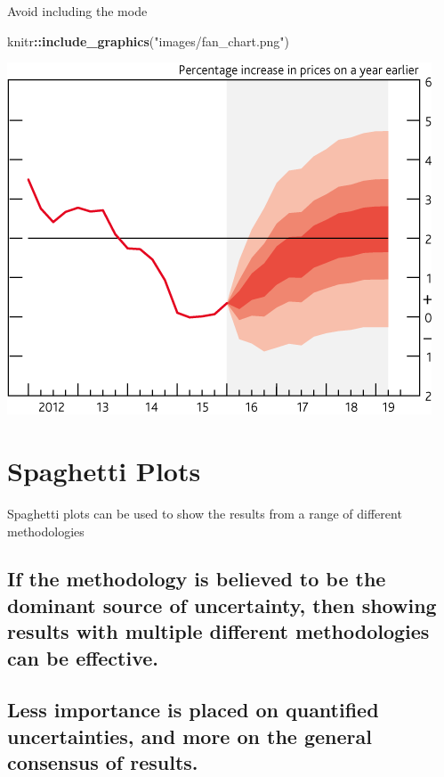 \documentclass[]{book}
\newenvironment{Shaded}{\begin{snugshade}}{\end{snugshade}}
\newcommand{\KeywordTok}[1]{\textcolor[rgb]{0.13,0.29,0.53}{\textbf{#1}}}
\newcommand{\StringTok}[1]{\textcolor[rgb]{0.31,0.60,0.02}{#1}}
\newcommand{\OperatorTok}[1]{\textcolor[rgb]{0.81,0.36,0.00}{\textbf{#1}}}
\newcommand{\NormalTok}[1]{#1}
\begin{document}
 Avoid including the mode

\begin{Shaded}
\begin{Highlighting}[]
\NormalTok{knitr}\OperatorTok{::}\KeywordTok{include_graphics}\NormalTok{(}\StringTok{"images/fan_chart.png"}\NormalTok{)}
\end{Highlighting}
\end{Shaded}

\begin{center}\includegraphics{images/fan_chart} \end{center}

\section{Spaghetti Plots}\label{spaghetti-plots}

 Spaghetti plots can be used to show the results from a range of
different methodologies

\subsection{If the methodology is believed to be the dominant source of
uncertainty, then showing results with multiple different methodologies
can be
effective.}\label{if-the-methodology-is-believed-to-be-the-dominant-source-of-uncertainty-then-showing-results-with-multiple-different-methodologies-can-be-effective.}

\subsection{Less importance is placed on quantified uncertainties, and
more on the general consensus of
results.}\label{less-importance-is-placed-on-quantified-uncertainties-and-more-on-the-general-consensus-of-results.}
\end{document}

